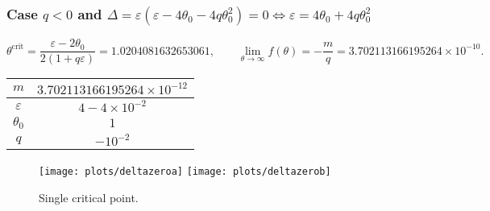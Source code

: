 \documentclass[
    8pt,
    aspectratio=1610,
    c,
    intlimits,
    leqno,
    professionalfonts,
]{beamer}
\begin{document}




\begin{frame}
	\frametitle{Case $q<0$ and
		\begin{math}
			\Delta=
			\varepsilon\left(\varepsilon-4\theta_{0}-4q\theta^{2}_{0}\right)=
			0\iff\varepsilon=4\theta_{0}+4q\theta^{2}_{0}
		\end{math}
	}

	\begin{equation*}
		\theta^{\text{crit}}=
		\frac{\varepsilon-2\theta_{0}}{2\left(1+q\varepsilon\right)}=
		1.0204081632653061,\qquad
		\lim_{\theta\to\infty}f\left(\theta\right)=
		-\frac{m}{q}=
		3.702113166195264\times 10^{-10}.
	\end{equation*}

	\begin{table}[ht!]
		\begin{tabular}{cc}
			\hline
			$m$           & $3.702113166195264\times 10^{-12}$ \\
			\hline
			$\varepsilon$ & $4-4\times 10^{-2}$                \\
			\hline
			$\theta_{0}$  & $1$                                \\
			\hline
			$q$           & $-10^{-2}$                         \\
			\hline
		\end{tabular}
	\end{table}

	\begin{figure}[ht!]
		\centering
		\texttt{[image: plots/deltazeroa]}
		\texttt{[image: plots/deltazerob]}
		\caption{Single critical point.}
	\end{figure}
\end{frame}
\end{document}
